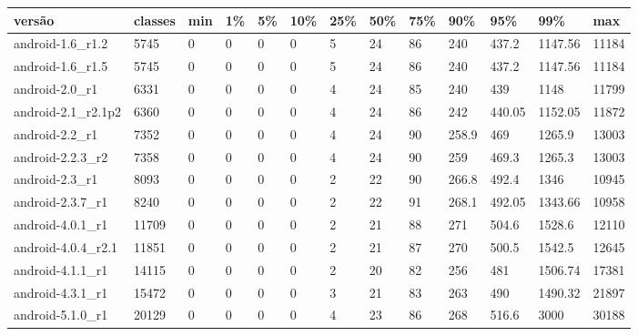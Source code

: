 \begin{tabular}{|l|l|l|l|l|l|l|l|l|l|l|l|l|}
\hline
versão&classes&min&1\%&5\%&10\%&25\%&50\%&75\%&90\%&95\%&99\%&max\\
\hline
android-1.6\_r1.2&5745&0&0&0&0&5&24&86&240&437.2&1147.56&11184\\
\hline
android-1.6\_r1.5&5745&0&0&0&0&5&24&86&240&437.2&1147.56&11184\\
\hline
android-2.0\_r1&6331&0&0&0&0&4&24&85&240&439&1148&11799\\
\hline
android-2.1\_r2.1p2&6360&0&0&0&0&4&24&86&242&440.05&1152.05&11872\\
\hline
android-2.2\_r1&7352&0&0&0&0&4&24&90&258.9&469&1265.9&13003\\
\hline
android-2.2.3\_r2&7358&0&0&0&0&4&24&90&259&469.3&1265.3&13003\\
\hline
android-2.3\_r1&8093&0&0&0&0&2&22&90&266.8&492.4&1346&10945\\
\hline
android-2.3.7\_r1&8240&0&0&0&0&2&22&91&268.1&492.05&1343.66&10958\\
\hline
android-4.0.1\_r1&11709&0&0&0&0&2&21&88&271&504.6&1528.6&12110\\
\hline
android-4.0.4\_r2.1&11851&0&0&0&0&2&21&87&270&500.5&1542.5&12645\\
\hline
android-4.1.1\_r1&14115&0&0&0&0&2&20&82&256&481&1506.74&17381\\
\hline
android-4.3.1\_r1&15472&0&0&0&0&3&21&83&263&490&1490.32&21897\\
\hline
android-5.1.0\_r1&20129&0&0&0&0&4&23&86&268&516.6&3000&30188\\
\hline
\end{tabular}
